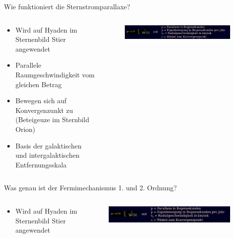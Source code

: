   \begin{frame}{Wie funktioniert die Sternstromparallaxe?}
    \begin{columns}
   \begin{column}{0.5\textwidth}
    \begin{itemize}
      \setlength\itemsep{2em}
      \item Wird auf Hyaden im Sternenbild Stier angewendet
      \item Parallele Raumgeschwindigkeit vom gleichen Betrag
      \item Bewegen sich auf Konvergenzunkt zu (Beteigeuze im Sternbild Orion)
      \item Basis der galaktischen und intergalaktischen Entfernungsskala
     \end{itemize}
  \vspace{2em}
  \end{column}
  \begin{column}{0.5\textwidth}
  \begin{figure}
    \centering
    \includegraphics[width=\textwidth]{images/sternstromparallaxe.png}
  \end{figure}
  \end{column}
    \end{columns}
  \end{frame}


  \begin{frame}{Was genau ist der Fermimechanismus 1. und 2. Ordnung?}
    \begin{columns}
   \begin{column}{0.5\textwidth}
    \begin{itemize}
      \setlength\itemsep{2em}
      \item Wird auf Hyaden im Sternenbild Stier angewendet
     \end{itemize}
  \vspace{2em}
  \end{column}
  \begin{column}{0.5\textwidth}
  \begin{figure}
    \centering
    \includegraphics[width=\textwidth]{images/sternstromparallaxe.png}
  \end{figure}
  \end{column}
    \end{columns}
  \end{frame}

